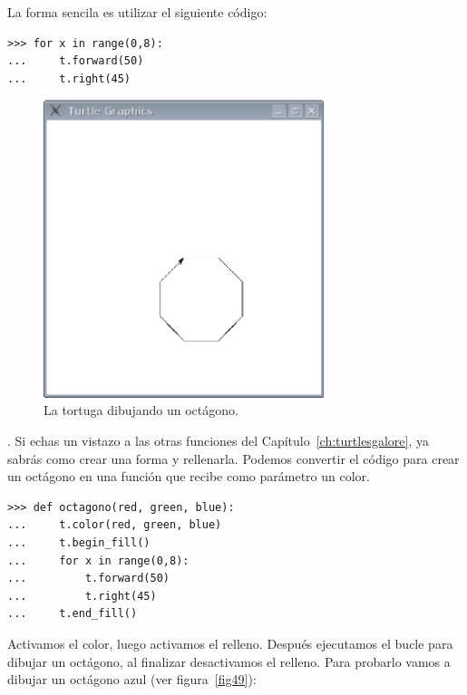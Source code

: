 \noindent
La forma sencila es utilizar el siguiente código:

\begin{listing}
\begin{verbatim}
>>> for x in range(0,8):
...     t.forward(50)
...     t.right(45)
\end{verbatim}
\end{listing}

\begin{figure}
\begin{center}
\includegraphics[width=82mm]{figure48.eps}
\end{center}
\caption{La tortuga dibujando un octágono.}\label{fig48}
\end{figure}

.  Si echas un vistazo a las otras funciones del Capítulo~\ref{ch:turtlesgalore}, ya sabrás como crear una forma y rellenarla.   Podemos convertir el código para crear un octágono en una función que recibe como parámetro un color.

\begin{listing}
\begin{verbatim}
>>> def octagono(red, green, blue):
...     t.color(red, green, blue)
...     t.begin_fill()
...     for x in range(0,8):
...         t.forward(50)
...         t.right(45)
...     t.end_fill()
\end{verbatim}
\end{listing}

Activamos el color, luego activamos el relleno.   Después ejecutamos el bucle para dibujar un octágono, al finalizar desactivamos el relleno.  Para probarlo vamos a dibujar un octágono azul (ver figura~\ref{fig49}):

